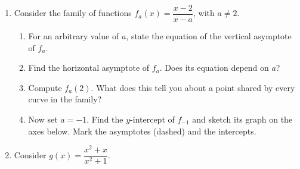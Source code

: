 \documentclass[12pt, twoside]{article}
\begin{document}
\begin{enumerate}[itemsep=0.4cm]
\newpage

\item[2.] Consider the family of functions
$\displaystyle f_a(x)=\dfrac{x-2}{x-a}$, with $a\ne 2$.

\begin{enumerate}[label=(\alph*), itemsep=0.3cm]
  \item For an arbitrary value of $a$, state the equation of the
  vertical asymptote of $f_a$.

  \vspace{1.2cm}

  \item Find the horizontal asymptote of $f_a$. Does its equation
  depend on $a$?

  \vspace{1.8cm}

  \item Compute $f_a(2)$. What does this tell you about a point
  shared by every curve in the family?

  \vspace{2.5cm}

  \item Now set $a=-1$. Find the $y$-intercept of $f_{-1}$ and
  sketch its graph on the axes below. Mark the asymptotes
  (dashed) and the intercepts.
\end{enumerate}

\begin{figure}[H]
\begin{center}
\end{center}
\end{figure}

\newpage

\item[3.] Consider $\displaystyle g(x)=\dfrac{x^2+x}{x^2+1}$.


\end{enumerate}
\end{document}
